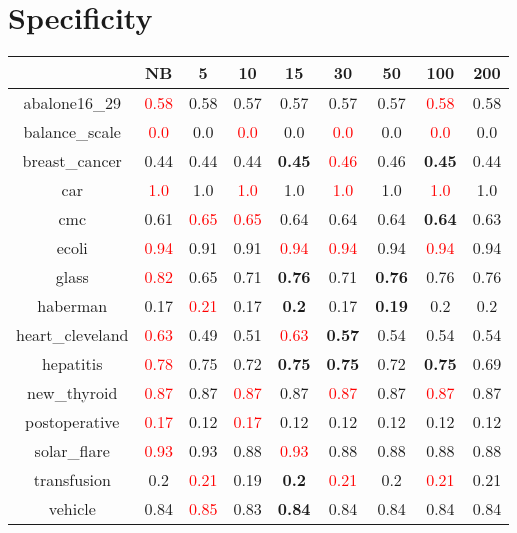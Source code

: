 \documentclass{article}%
\begin{document}
\section*{Specificity}%
\begin{tabular}{c|cccccccc}%
\hline%
&NB&5&10&15&30&50&100&200\\%
\hline%
abalone16\_29&\textcolor{red}{ 
0.58
}&0.58&0.57&0.57&0.57&0.57&\textcolor{red}{ 
0.58
}&0.58\\%
\hline%
balance\_scale&\textcolor{red}{ 
0.0
}&0.0&\textcolor{red}{ 
0.0
}&0.0&\textcolor{red}{ 
0.0
}&0.0&\textcolor{red}{ 
0.0
}&0.0\\%
\hline%
breast\_cancer&0.44&0.44&0.44&\textbf{0.45}&\textcolor{red}{ 
0.46
}&0.46&\textbf{0.45}&0.44\\%
\hline%
car&\textcolor{red}{ 
1.0
}&1.0&\textcolor{red}{ 
1.0
}&1.0&\textcolor{red}{ 
1.0
}&1.0&\textcolor{red}{ 
1.0
}&1.0\\%
\hline%
cmc&0.61&\textcolor{red}{ 
0.65
}&\textcolor{red}{ 
0.65
}&0.64&0.64&0.64&\textbf{0.64}&0.63\\%
\hline%
ecoli&\textcolor{red}{ 
0.94
}&0.91&0.91&\textcolor{red}{ 
0.94
}&\textcolor{red}{ 
0.94
}&0.94&\textcolor{red}{ 
0.94
}&0.94\\%
\hline%
glass&\textcolor{red}{ 
0.82
}&0.65&0.71&\textbf{0.76}&0.71&\textbf{0.76}&0.76&0.76\\%
\hline%
haberman&0.17&\textcolor{red}{ 
0.21
}&0.17&\textbf{0.2}&0.17&\textbf{0.19}&0.2&0.2\\%
\hline%
heart\_cleveland&\textcolor{red}{ 
0.63
}&0.49&0.51&\textcolor{red}{ 
0.63
}&\textbf{0.57}&0.54&0.54&0.54\\%
\hline%
hepatitis&\textcolor{red}{ 
0.78
}&0.75&0.72&\textbf{0.75}&\textbf{0.75}&0.72&\textbf{0.75}&0.69\\%
\hline%
new\_thyroid&\textcolor{red}{ 
0.87
}&0.87&\textcolor{red}{ 
0.87
}&0.87&\textcolor{red}{ 
0.87
}&0.87&\textcolor{red}{ 
0.87
}&0.87\\%
\hline%
postoperative&\textcolor{red}{ 
0.17
}&0.12&\textcolor{red}{ 
0.17
}&0.12&0.12&0.12&0.12&0.12\\%
\hline%
solar\_flare&\textcolor{red}{ 
0.93
}&0.93&0.88&\textcolor{red}{ 
0.93
}&0.88&0.88&0.88&0.88\\%
\hline%
transfusion&0.2&\textcolor{red}{ 
0.21
}&0.19&\textbf{0.2}&\textcolor{red}{ 
0.21
}&0.2&\textcolor{red}{ 
0.21
}&0.21\\%
\hline%
vehicle&0.84&\textcolor{red}{ 
0.85
}&0.83&\textbf{0.84}&0.84&0.84&0.84&0.84\\%

\end{tabular}
\end{document}
